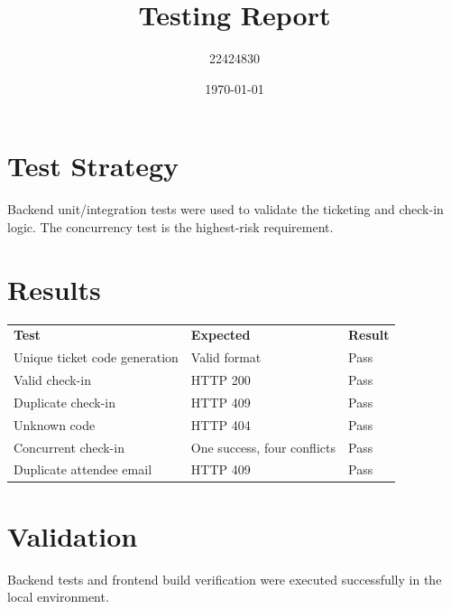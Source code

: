 \documentclass[11pt]{article}
\begin{document}
\title{Testing Report}
\author{22424830}
\date{\today}
\maketitle
\section{Test Strategy}
Backend unit/integration tests were used to validate the ticketing and check-in logic. The concurrency test is the highest-risk requirement.
\section{Results}
\begin{longtable}{p{5cm}p{2.5cm}p{4cm}}
\textbf{Test} & \textbf{Expected} & \textbf{Result} \\
Unique ticket code generation & Valid format & Pass \\
Valid check-in & HTTP 200 & Pass \\
Duplicate check-in & HTTP 409 & Pass \\
Unknown code & HTTP 404 & Pass \\
Concurrent check-in & One success, four conflicts & Pass \\
Duplicate attendee email & HTTP 409 & Pass \\
\end{longtable}
\section{Validation}
Backend tests and frontend build verification were executed successfully in the local environment.
\end{document}
